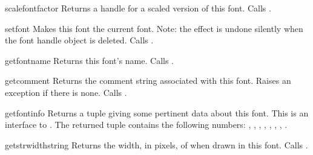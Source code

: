\begin{funcdesc}{scalefont}{factor}
Returns a handle for a scaled version of this font.
Calls .
\end{funcdesc}

\begin{funcdesc}{setfont}{}
Makes this font the current font.
Note: the effect is undone silently when the font handle object is
deleted.
Calls .
\end{funcdesc}

\begin{funcdesc}{getfontname}{}
Returns this font's name.
Calls .
\end{funcdesc}

\begin{funcdesc}{getcomment}{}
Returns the comment string associated with this font.
Raises an exception if there is none.
Calls .
\end{funcdesc}

\begin{funcdesc}{getfontinfo}{}
Returns a tuple giving some pertinent data about this font.
This is an interface to .
The returned tuple contains the following numbers:
\code{(}, , ,
, , , ,
\code{)}.
\end{funcdesc}

\begin{funcdesc}{getstrwidth}{string}
Returns the width, in pixels, of  when drawn in this font.
Calls .
\end{funcdesc}
